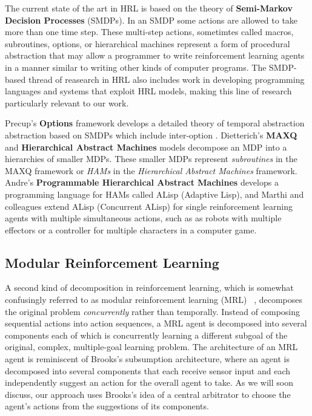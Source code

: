 The current state of the art in HRL is based on the theory of {\bf Semi-Markov Decision Processes} (SMDPs). In an SMDP some actions are allowed to take more than one time step. These multi-step actions, sometimtes called macros, subroutines, options, or hierarchical machines represent a form of procedural abstraction that may allow a programmer to write reinforcement learning agents in a manner similar to writing other kinds of computer programs. The SMDP-based thread of reasearch in HRL also includes work in developing programming languages and systems that exploit HRL models, making this line of research particularly relevant to our work.

Precup's {\bf Options} \cite{precup1998a-theoretical,sutton1999between,precup2000a-temporal} framework develops a detailed theory of temporal abstraction abstraction based on SMDPs which include inter-option . Dietterich's {\bf MAXQ} \cite{dietterich1998maxq,dietterich2000hierarchical} and {\bf Hierarchical Abstract Machines} \cite{parr1998reinforcement} models decompose an MDP into a hierarchies of smaller MDPs. These smaller MDPs represent {\it subroutines} in the MAXQ framework or {\it HAMs} in the {\it Hierarchical Abstract Machines} framework. Andre's {\bf Programmable Hierarchical Abstract Machines} \cite{andre2000programmable,andre2002state} develops a programming language for HAMs called ALisp (Adaptive Lisp), and Marthi and colleagues  \cite{marthi2005concurrent} extend ALisp (Concurrent ALisp) for single reinforcement learning agents with multiple simultaneous actions, such as as robots with multiple effectors or a controller for multiple characters in a computer game.


\subsection{Modular Reinforcement Learning}

A second kind of decomposition in reinforcement learning, which is somewhat confusingly referred to as modular reinforcement learning (MRL) ~\cite{russell2003q-decomposition,sprague2003multiple-goal}, decomposes the original problem {\it concurrently} rather than temporally. Instead of composing sequential actions into action sequences, a MRL agent is decomposed into several components each of which is concurrently learning a different subgoal of the original, complex, multiple-goal learning problem. The architecture of an MRL agent is reminiscent of Brooks's subsumption architecture, where an agent is decomposed into several components that each receive sensor input and each independently suggest an action for the overall agent to take. As we will soon discuss, our approach uses Brooks's idea of a central arbitrator to choose the agent's actions from the suggestions of its components.

